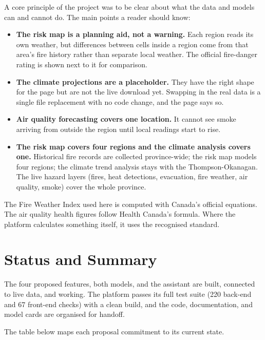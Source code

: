 \documentclass[11pt]{article}
\newcommand{\callout}[1]{%
  \par\medskip\noindent
  \colorbox{mist}{\parbox{\dimexpr\linewidth-2\fboxsep}{\color{ink}\small #1}}%
  \par\medskip}
\begin{document}
A core principle of the project was to be clear about what the data and models
can and cannot do. The main points a reader should know:

\begin{itemize}[leftmargin=1.4em, itemsep=0.3em]
\item \textbf{The risk map is a planning aid, not a warning.} Each region reads
its own weather, but differences between cells inside a region come from that
area's fire history rather than separate local weather. The official fire-danger
rating is shown next to it for comparison.
\item \textbf{The climate projections are a placeholder.} They have the right
shape for the page but are not the live download yet. Swapping in the real data
is a single file replacement with no code change, and the page says so.
\item \textbf{Air quality forecasting covers one location.} It cannot see smoke
arriving from outside the region until local readings start to rise.
\item \textbf{The risk map covers four regions and the climate analysis covers
one.} Historical fire records are collected province-wide; the risk map models
four regions; the climate trend analysis stays with the Thompson-Okanagan. The
live hazard layers (fires, heat detections, evacuation, fire weather, air
quality, smoke) cover the whole province.
\end{itemize}

\callout{The Fire Weather Index used here is computed with Canada's official
equations. The air quality health figures follow Health Canada's formula. Where
the platform calculates something itself, it uses the recognised standard.}

\section{Status and Summary}

The four proposed features, both models, and the assistant are built, connected
to live data, and working. The platform passes its full test suite (220 back-end
and 67 front-end checks) with a clean build, and the code, documentation, and model cards are
organised for handoff.

The table below maps each proposal commitment to its current state.
\end{document}
